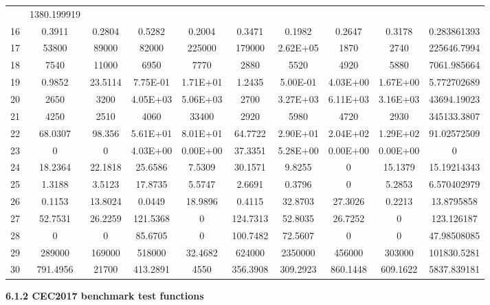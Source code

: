\documentclass[
]{article}
\begin{document}
\begin{justify}
{\begin{table}[h!]
\begin{tabular}{||c c c c c c c c c c||}
  & 1380.199919\\  16 & 0.3911 & 0.2804 & 0.5282 & 0.2004 & 0.3471 & 0.1982 &
  0.2647 & 0.3178 & 0.283861393 \\ 17 & 53800 & 89000 & 82000 & 225000 & 179000 &
  2.62E+05 & 1870 & 2740 & 225646.7994 \\ 18 & 7540 & 11000 & 6950 & 7770 & 2880
  & 5520 & 4920 & 5880 & 7061.985664 \\ 19 & 0.9852 & 23.5114 & 7.75E-01 &
  1.71E+01 & 1.2435 & 5.00E-01 & 4.03E+00 & 1.67E+00 & 5.772702689 \\ 20 & 2650 &
  3200 & 4.05E+03 & 5.06E+03 & 2700 & 3.27E+03 & 6.11E+03 & 3.16E+03 &
  43694.19023 \\ 21 & 4250 & 2510 & 4060 & 33400 & 2920 & 5980 & 4720 & 2930 &
  345133.3807 \\ 22 & 68.0307 & 98.356 & 5.61E+01 & 8.01E+01 & 64.7722 & 2.90E+01
  & 2.04E+02 & 1.29E+02 & 91.02572509\\  23 & 0 & 0 & 4.03E+00 & 0.00E+00 &
  37.3351 & 5.28E+00 & 0.00E+00 & 0.00E+00 & 0 \\ 24 & 18.2364 & 22.1818 &
  25.6586 & 7.5309 & 30.1571 & 9.8255 & 0 & 15.1379 & 15.19214343\\  25 & 1.3188
  & 3.5123 & 17.8735 & 5.5747 & 2.6691 & 0.3796 & 0 & 5.2853 & 6.570402979 \\ 26
  & 0.1153 & 13.8024 & 0.0449 & 18.9896 & 0.4115 & 32.8703 & 27.3026 & 0.2213
  & 13.8795858 \\ 27 & 52.7531 & 26.2259 & 121.5368 & 0 & 124.7313 & 52.8035 &
  26.7252 & 0 & 123.126187 \\ 28 & 0 & 0 & 85.6705 & 0 & 100.7482 & 72.5607 & 0 &
  0 & 47.98508085 \\ 29 & 289000 & 169000 & 518000 & 32.4682 & 624000 & 2350000 &
  456000 & 303000 & 101830.5281 \\ 30 & 791.4956 & 21700 & 413.2891 & 4550 &
  356.3908 & 309.2923 & 860.1448 & 609.1622 & 5837.839181 \\

 


\hline
\end{tabular}
\end{table}


\newpage
\def\labelenumi{\arabic{enumi}.}
\item


\def\labelenumi{\arabic{enumi}.}
\item
\vspace{5mm}
  \textbf{6.1.2 CEC2017 benchmark test functions}
  
}
\end{justify}
\end{document}
